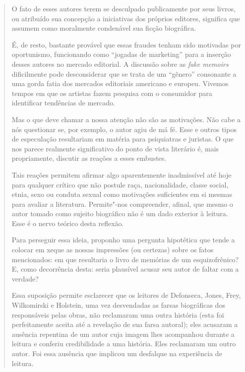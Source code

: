 \begin{quote}
O fato de esses autores terem se desculpado publicamente por seus
livros, ou atribuído sua concepção a iniciativas dos próprios editores,
significa que assumem como moralmente condenável sua ficção biográfica.

É, de resto, bastante provável que essas fraudes tenham sido motivadas
por oportunismo, funcionando como ``jogadas de marketing'' para a
inserção desses autores no mercado editorial. A discussão sobre as
\emph{fake memoirs} dificilmente pode desconsiderar que se trata de um
``gênero'' consonante a uma gorda fatia dos mercados editoriais
americano e europeu. Vivemos tempos em que os artistas fazem pesquisa
com o consumidor para identificar tendências de mercado.

Mas o que deve chamar a nossa atenção não são as motivações. Não cabe a
nós questionar se, por exemplo, o autor agiu de má fé. Esse e outros
tipos de especulação resultariam em matéria para psiquiatras e juristas.
O que nos parece realmente significativo do ponto de vista literário é,
mais propriamente, discutir as reações a esses embustes.

Tais reações permitem afirmar algo aparentemente inadmissível até hoje
para qualquer crítico que não postule raça, nacionalidade, classe
social, etnia, sexo ou conduta sexual como motivações suficientes em si
mesmas para avaliar a literatura. Permite"-nos compreender, afinal, que
mesmo o autor tomado como sujeito biográfico não é um dado exterior à
leitura. Esse é o nervo teórico desta reflexão.

Para perseguir essa ideia, proponho uma pergunta hipotética que tende a
colocar em xeque as nossas impressões (ou certezas) sobre os fatos
mencionados: em que resultaria o livro de memórias de um esquizofrênico?
E, como decorrência desta: seria plausível acusar seu autor de faltar
com a verdade?

Essa suposição permite esclarecer que os leitores de Defonseca, Jones,
Frey, Wilkomirski e Holstein, uma vez desvendadas as farsas biográficas
dos responsáveis pelas obras, não reclamaram uma outra história (esta
foi perfeitamente aceita até a revelação de sua farsa autoral); eles
acusaram a ausência repentina de um autor cuja imagem lhes acompanhou
durante a leitura e conferiu credibilidade a uma história. Eles
reclamaram um outro autor. Foi essa ausência que implicou um desfalque
na experiência de leitura.


\end{quote}
